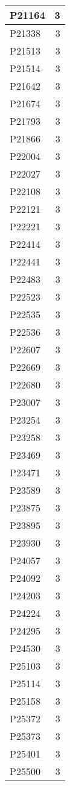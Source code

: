 \documentclass[
]{book}
\theoremstyle{definition}
\theoremstyle{definition}
\theoremstyle{definition}
\theoremstyle{definition}
\theoremstyle{remark}
\begin{document}
\begin{table}
\begin{tabular}{l|r}
\hline
P21164 & 3\\
\hline
P21338 & 3\\
\hline
P21513 & 3\\
\hline
P21514 & 3\\
\hline
P21642 & 3\\
\hline
P21674 & 3\\
\hline
P21793 & 3\\
\hline
P21866 & 3\\
\hline
P22004 & 3\\
\hline
P22027 & 3\\
\hline
P22108 & 3\\
\hline
P22121 & 3\\
\hline
P22221 & 3\\
\hline
P22414 & 3\\
\hline
P22441 & 3\\
\hline
P22483 & 3\\
\hline
P22523 & 3\\
\hline
P22535 & 3\\
\hline
P22536 & 3\\
\hline
P22607 & 3\\
\hline
P22669 & 3\\
\hline
P22680 & 3\\
\hline
P23007 & 3\\
\hline
P23254 & 3\\
\hline
P23258 & 3\\
\hline
P23469 & 3\\
\hline
P23471 & 3\\
\hline
P23589 & 3\\
\hline
P23875 & 3\\
\hline
P23895 & 3\\
\hline
P23930 & 3\\
\hline
P24057 & 3\\
\hline
P24092 & 3\\
\hline
P24203 & 3\\
\hline
P24224 & 3\\
\hline
P24295 & 3\\
\hline
P24530 & 3\\
\hline
P25103 & 3\\
\hline
P25114 & 3\\
\hline
P25158 & 3\\
\hline
P25372 & 3\\
\hline
P25373 & 3\\
\hline
P25401 & 3\\
\hline
P25500 & 3\\

\end{tabular}
\end{table}
\end{document}
